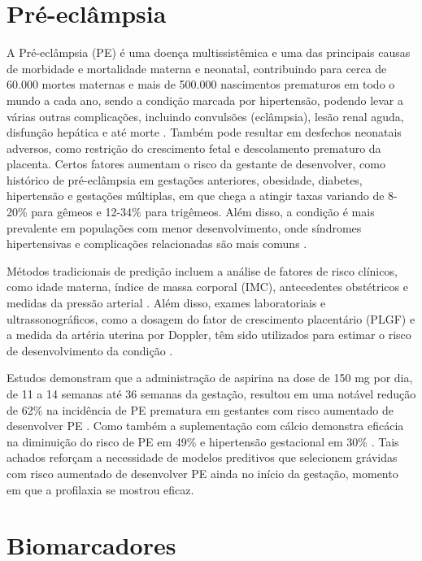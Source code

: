 \documentclass[12pt, a4paper]{report}
\theoremstyle{definition}
\theoremstyle{remark}
\theoremstyle{plain}
\begin{document}
\section{Pré-eclâmpsia}

A Pré-eclâmpsia (PE) é uma doença multissistêmica e uma das principais causas de morbidade e mortalidade materna e neonatal, contribuindo para cerca de 60.000 mortes maternas e mais de 500.000 nascimentos prematuros em todo o mundo a cada ano, sendo a condição marcada por hipertensão, podendo levar a várias outras complicações, incluindo convulsões (eclâmpsia), lesão renal aguda, disfunção hepática e até morte \cite{Silva2024Impactos}. Também pode resultar em desfechos neonatais adversos, como restrição do crescimento fetal e descolamento prematuro da placenta. Certos fatores aumentam o risco da gestante de desenvolver, como histórico de pré-eclâmpsia em gestações anteriores, obesidade, diabetes, hipertensão e gestações múltiplas, em que chega a atingir taxas variando de 8-20\% para gêmeos e 12-34\% para trigêmeos. Além disso, a condição é mais prevalente em populações com menor desenvolvimento, onde síndromes hipertensivas e complicações relacionadas são mais comuns \cite{Maayeh_2020}.

Métodos tradicionais de predição incluem a análise de fatores de risco clínicos, como idade materna, índice de massa corporal (IMC), antecedentes obstétricos e medidas da pressão arterial \cite{ACOG2020}.  Além disso, exames laboratoriais e ultrassonográficos, como a dosagem do fator de crescimento placentário (PLGF) e a medida da artéria uterina por Doppler, têm sido utilizados para estimar o risco de desenvolvimento da condição \cite{Poon2014}.

Estudos demonstram que a administração de aspirina na dose de 150 mg por dia, de 11 a 14 semanas até 36 semanas da gestação, resultou em uma notável redução de 62\% na incidência de PE prematura em gestantes com risco aumentado de desenvolver PE \cite{Rolnik_2017}. Como também a suplementação com cálcio demonstra eficácia na diminuição do risco de PE em 49\% e hipertensão gestacional em 30\% \cite{Jaiswal2024}. Tais achados reforçam a necessidade de modelos preditivos que selecionem grávidas com risco aumentado de desenvolver PE ainda no início da gestação, momento em que a profilaxia se mostrou eficaz.

\section{Biomarcadores}
\end{document}
